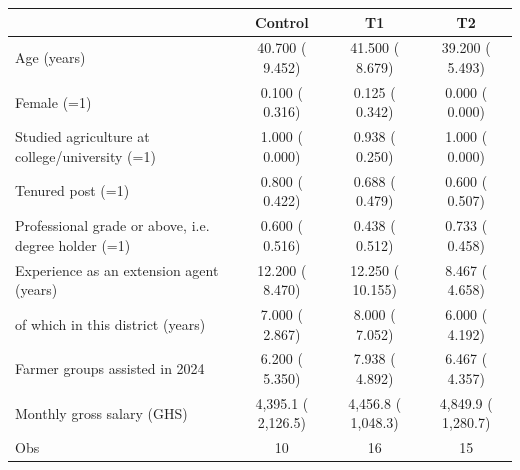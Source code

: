 \def\sym#1{\ifmmode^{#1}\else\(^{#1}\)\fi}
\begin{tabular}{lccc}
\toprule
 & Control & T1 & T2 \\
\midrule
Age (years) &    40.700 (    9.452) &    41.500 (    8.679) &    39.200 (    5.493) \\
Female (=1) &     0.100 (    0.316) &     0.125 (    0.342) &     0.000 (    0.000) \\
Studied agriculture at college/university (=1) &     1.000 (    0.000) &     0.938 (    0.250) &     1.000 (    0.000) \\
Tenured post (=1) &     0.800 (    0.422) &     0.688 (    0.479) &     0.600 (    0.507) \\
Professional grade or above, i.e. degree holder (=1) &     0.600 (    0.516) &     0.438 (    0.512) &     0.733 (    0.458) \\
Experience as an extension agent (years) &    12.200 (    8.470) &    12.250 (   10.155) &     8.467 (    4.658) \\
\quad of which in this district (years) &     7.000 (    2.867) &     8.000 (    7.052) &     6.000 (    4.192) \\
Farmer groups assisted in 2024 &     6.200 (    5.350) &     7.938 (    4.892) &     6.467 (    4.357) \\
Monthly gross salary (GHS) &      4,395.1 (     2,126.5) &      4,456.8 (     1,048.3) &      4,849.9 (     1,280.7) \\
\midrule
Obs &        10 &        16 &        15 \\
\bottomrule
\end{tabular}
